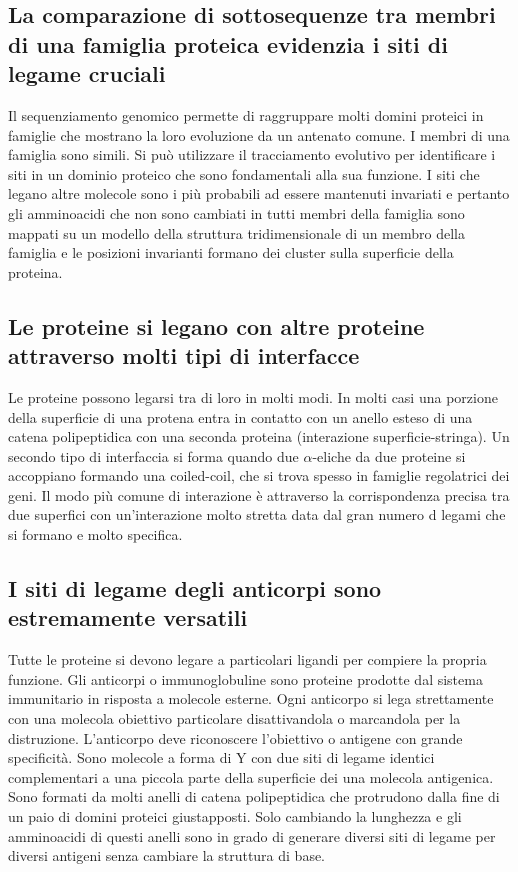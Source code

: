 \subsection{La comparazione di sottosequenze tra membri di una famiglia proteica evidenzia i siti di legame cruciali}
Il sequenziamento genomico permette di raggruppare molti domini proteici in famiglie che mostrano la loro evoluzione da un antenato comune. I membri di una famiglia sono simili. Si 
pu\`o utilizzare il tracciamento evolutivo per identificare i siti in un dominio proteico che sono fondamentali alla sua funzione. I siti che legano altre molecole sono i pi\`u 
probabili ad essere mantenuti invariati e pertanto gli amminoacidi che non sono cambiati in tutti membri della famiglia sono mappati su un modello della struttura tridimensionale di 
un membro della famiglia e le posizioni invarianti formano dei cluster sulla superficie della proteina. 
\subsection{Le proteine si legano con altre proteine attraverso molti tipi di interfacce}
Le proteine possono legarsi tra di loro in molti modi. In molti casi una porzione della superficie di una protena entra in contatto con un anello esteso di una catena polipeptidica con 
una seconda proteina (interazione superficie-stringa). Un secondo tipo di interfaccia si forma quando due $\alpha$-eliche da due proteine si accoppiano formando una coiled-coil, che
si trova spesso in famiglie regolatrici dei geni. Il modo pi\`u comune di interazione \`e attraverso la corrispondenza precisa tra due superfici con un'interazione molto stretta data dal
gran numero d legami che si formano e molto specifica. 
\subsection{I siti di legame degli anticorpi sono estremamente versatili}
Tutte le proteine si devono legare a particolari ligandi per compiere la propria funzione. Gli anticorpi o immunoglobuline sono proteine prodotte dal sistema immunitario in risposta
a molecole esterne. Ogni anticorpo si lega strettamente con una molecola obiettivo particolare disattivandola o marcandola per la distruzione. L'anticorpo deve riconoscere l'obiettivo
o antigene con grande specificit\`a. Sono molecole a forma di Y con due siti di legame identici complementari a una piccola parte della superficie dei una molecola antigenica. Sono
formati da molti anelli di catena polipeptidica che protrudono dalla fine di un paio di domini proteici giustapposti. Solo cambiando la lunghezza e gli amminoacidi di questi anelli sono
in grado di generare diversi siti di legame per diversi antigeni senza cambiare la struttura di base. 
